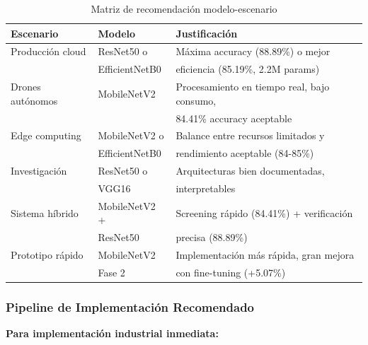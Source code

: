 \documentclass[11pt, a4paper]{article}
\begin{document}
\begin{table}[H]
\centering
\caption{Matriz de recomendación modelo-escenario}
\label{tab:recommendations}
\begin{tabular}{@{}llp{6cm}@{}}
\toprule
\textbf{Escenario} & \textbf{Modelo} & \textbf{Justificación} \\
\midrule
Producción cloud       & ResNet50 o      & Máxima accuracy (88.89\%) o mejor \\
                       & EfficientNetB0  & eficiencia (85.19\%, 2.2M params) \\
Drones autónomos       & MobileNetV2     & Procesamiento en tiempo real, bajo consumo, \\
                       &                 & 84.41\% accuracy aceptable \\
Edge computing         & MobileNetV2 o   & Balance entre recursos limitados y \\
                       & EfficientNetB0  & rendimiento aceptable (84-85\%) \\
Investigación          & ResNet50 o      & Arquitecturas bien documentadas, \\
                       & VGG16           & interpretables \\
Sistema híbrido        & MobileNetV2 +   & Screening rápido (84.41\%) + verificación \\
                       & ResNet50        & precisa (88.89\%) \\
Prototipo rápido       & MobileNetV2     & Implementación más rápida, gran mejora \\
                       & Fase 2          & con fine-tuning (+5.07\%) \\
\bottomrule
\end{tabular}
\end{table}

\subsubsection{Pipeline de Implementación Recomendado}

\textbf{Para implementación industrial inmediata:}
\end{document}
